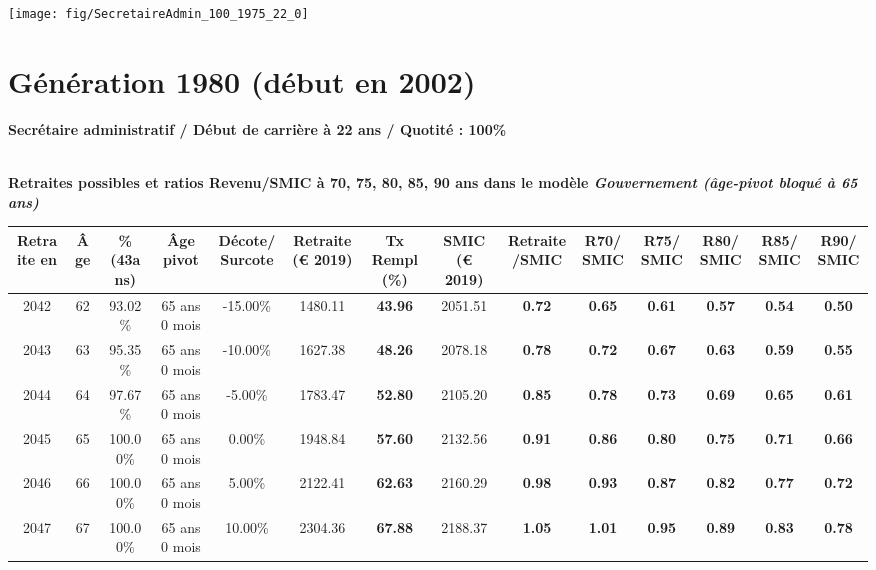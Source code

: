  {\hspace{-2.2cm}\texttt{[image: fig/SecretaireAdmin\_100\_1975\_22\_0]}} 

\newpage 
 
\section{Génération 1980 (début en 2002)\label{SecretaireAdmin_100_1980_22_0}} 
 
{\bf \noindent Secrétaire administratif / Début de carrière à 22 ans / Quotité : 100\%}  ~ 

 ~\\{\bf \noindent Retraites possibles et ratios Revenu/SMIC à 70, 75, 80, 85, 90 ans dans le modèle \emph{Gouvernement (âge-pivot bloqué à 65 ans)}}  
 
\begin{adjustbox}{max width=\textwidth} 
\begin{tabular}[htb]{|c|c||c|c|c||c|c||c|c||c|c|c|c|c|} 
\hline 
 Retraite en &  Âge &  \%(43ans) &  Âge pivot &  Décote/Surcote &  Retraite (\euro{} 2019) &  Tx Rempl(\%) &  SMIC (\euro{} 2019) &  Retraite/SMIC &  R70/SMIC &  R75/SMIC &  R80/SMIC &  R85/SMIC &  R90/SMIC \\ 
\hline \hline 
 2042 &  62 &  93.02\% &  65 ans 0 mois &  -15.00\% &  1480.11 &  {\bf 43.96} &  2051.51 &  {\bf {\color{red} 0.72}} &  {\bf {\color{red} 0.65}} &  {\bf {\color{red} 0.61}} &  {\bf {\color{red} 0.57}} &  {\bf {\color{red} 0.54}} &  {\bf {\color{red} 0.50}} \\ 
\hline 
 2043 &  63 &  95.35\% &  65 ans 0 mois &  -10.00\% &  1627.38 &  {\bf 48.26} &  2078.18 &  {\bf {\color{red} 0.78}} &  {\bf {\color{red} 0.72}} &  {\bf {\color{red} 0.67}} &  {\bf {\color{red} 0.63}} &  {\bf {\color{red} 0.59}} &  {\bf {\color{red} 0.55}} \\ 
\hline 
 2044 &  64 &  97.67\% &  65 ans 0 mois &  -5.00\% &  1783.47 &  {\bf 52.80} &  2105.20 &  {\bf {\color{red} 0.85}} &  {\bf {\color{red} 0.78}} &  {\bf {\color{red} 0.73}} &  {\bf {\color{red} 0.69}} &  {\bf {\color{red} 0.65}} &  {\bf {\color{red} 0.61}} \\ 
\hline 
 2045 &  65 &  100.00\% &  65 ans 0 mois &  0.00\% &  1948.84 &  {\bf 57.60} &  2132.56 &  {\bf {\color{red} 0.91}} &  {\bf {\color{red} 0.86}} &  {\bf {\color{red} 0.80}} &  {\bf {\color{red} 0.75}} &  {\bf {\color{red} 0.71}} &  {\bf {\color{red} 0.66}} \\ 
\hline 
 2046 &  66 &  100.00\% &  65 ans 0 mois &  5.00\% &  2122.41 &  {\bf 62.63} &  2160.29 &  {\bf {\color{red} 0.98}} &  {\bf {\color{red} 0.93}} &  {\bf {\color{red} 0.87}} &  {\bf {\color{red} 0.82}} &  {\bf {\color{red} 0.77}} &  {\bf {\color{red} 0.72}} \\ 
\hline 
 2047 &  67 &  100.00\% &  65 ans 0 mois &  10.00\% &  2304.36 &  {\bf 67.88} &  2188.37 &  {\bf 1.05} &  {\bf 1.01} &  {\bf {\color{red} 0.95}} &  {\bf {\color{red} 0.89}} &  {\bf {\color{red} 0.83}} &  {\bf {\color{red} 0.78}} \\ 
\hline 
\hline 
\end{tabular} 
\end{adjustbox} 
 
